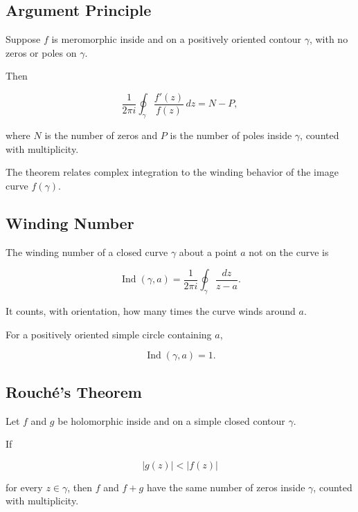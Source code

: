 \subsection{Argument Principle}
\label{subsec:argument-principle}

\begin{theorem}
Suppose \(f\) is meromorphic inside and on a positively oriented contour
\(\gamma\), with no zeros or poles on \(\gamma\).

Then

\[
\boxed{
\frac{1}{2\pi i}
\oint_\gamma
\frac{f'(z)}{f(z)}
\,dz
=
N-P,
}
\]

where \(N\) is the number of zeros and \(P\) is the number of poles inside
\(\gamma\), counted with multiplicity.
\end{theorem}

The theorem relates complex integration to the winding behavior of the
image curve \(f(\gamma)\).

\subsection{Winding Number}
\label{subsec:winding-number-complex}

The winding number of a closed curve \(\gamma\) about a point \(a\) not on
the curve is

\[
\boxed{
\operatorname{Ind}(\gamma,a)
=
\frac{1}{2\pi i}
\oint_\gamma
\frac{dz}{z-a}.
}
\]

It counts, with orientation, how many times the curve winds around \(a\).

For a positively oriented simple circle containing \(a\),

\[
\boxed{
\operatorname{Ind}(\gamma,a)=1.
}
\]

\subsection{Rouch\'e's Theorem}
\label{subsec:rouches-theorem}

\begin{theorem}
Let \(f\) and \(g\) be holomorphic inside and on a simple closed contour
\(\gamma\).

If

\[
\boxed{
|g(z)|<|f(z)|
}
\]

for every \(z\in\gamma\), then \(f\) and \(f+g\) have the same number of
zeros inside \(\gamma\), counted with multiplicity.
\end{theorem}

